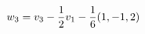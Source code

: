 \documentclass[preview]{standalone}
\begin{document}
\begin{align*}
\special{dvisvgm:raw <g id='unique000'>}w_3=v_3-\frac12v_1-\frac16(1,-1,2)\special{dvisvgm:raw </g>}
\end{align*}
\end{document}
